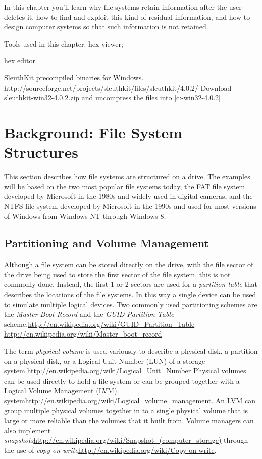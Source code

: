In this chapter you'll learn why file systems retain information after the
user deletes it, how to find and exploit this kind of residual
information, and how to design computer systems so that such
information is not retained.

Tools used in this chapter: hex viewer;

hex editor

SleuthKit precompiled binaries for
Windows. http://sourceforge.net/projects/sleuthkit/files/sleuthkit/4.0.2/
  Download sleuthkit-win32-4.0.2.zip and uncompress the files into
  |c:\sleuthkit-win32-4.0.2|



\section{Background: File System Structures}
This section describes how file systems are structured on a drive. The
examples will be based on the two most popular file systems today, the
FAT file system developed by Microsoft in the 1980s and widely used in
digital cameras, and the NTFS file system developed by Microsoft in
the 1990s and used for most versions of Windows from Windows NT
through Windows 8.


\subsection{Partitioning and Volume Management}

Although a file system can be stored directly on the drive, with the
file sector of the drive being used to store the first sector of the
file system, this is not commonly done. Instead, the first 1 or 2
sectors are used for a \emph{partition table} that describes the
locations of the file systems. In this way a single device can be used
to simulate multiple logical devices. Two commonly used partitioning
schemes are the \emph{Master Boot Record} and the \emph{GUID Partition
  Table} scheme.\url{http://en.wikipedia.org/wiki/GUID_Partition_Table}
       \url{http://en.wikipedia.org/wiki/Master_boot_record}

The term \emph{physical volume} is used variously to describe a
physical disk, a partition on a physical disk, or a Logical Unit
Number (LUN) of a storage
system.\url{http://en.wikipedia.org/wiki/Logical_Unit_Number}
Physical volumes can be used directly to hold a file system or can be
grouped together with a Logical Volume Management (LVM)
system\url{http://en.wikipedia.org/wiki/Logical_volume_management}. An
LVM can group multiple physical volumes together in to a single
physical volume that is large or more reliable than the volumes that
it built from. Volume managers can also implement
\emph{snapshots}\url{http://en.wikipedia.org/wiki/Snapshot_(computer_storage)}
through the use of
\emph{copy-on-write}\url{http://en.wikipedia.org/wiki/Copy-on-write}.

